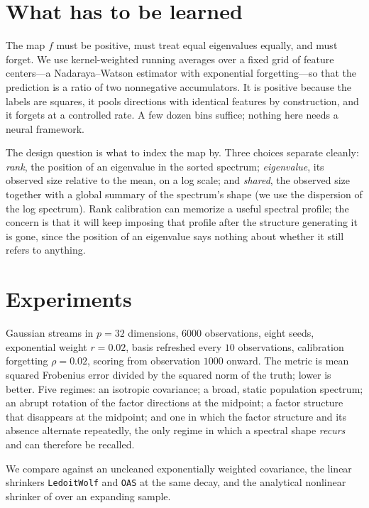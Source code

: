 \documentclass[11pt]{article}
\begin{document}
\section{What has to be learned}

The map $f$ must be positive, must treat equal eigenvalues equally, and must forget. We use
kernel-weighted running averages over a fixed grid of feature centers---a Nadaraya--Watson estimator
with exponential forgetting---so that the prediction is a ratio of two nonnegative accumulators. It
is positive because the labels are squares, it pools directions with identical features by
construction, and it forgets at a controlled rate. A few dozen bins suffice; nothing here needs a
neural framework.

The design question is what to index the map by. Three choices separate cleanly:
\emph{rank}, the position of an eigenvalue in the sorted spectrum; \emph{eigenvalue}, its observed
size relative to the mean, on a log scale; and \emph{shared}, the observed size together with a
global summary of the spectrum's shape (we use the dispersion of the log spectrum). Rank calibration
can memorize a useful spectral profile; the concern is that it will keep imposing that profile after
the structure generating it is gone, since the position of an eigenvalue says nothing about whether
it still refers to anything.

\section{Experiments}

Gaussian streams in $p = 32$ dimensions, $6000$ observations, eight seeds, exponential weight
$r = 0.02$, basis refreshed every $10$ observations, calibration forgetting $\rho = 0.02$, scoring
from observation $1000$ onward. The metric is mean squared Frobenius error divided by the squared
norm of the truth; lower is better. Five regimes: an isotropic covariance; a broad, static
population spectrum; an abrupt rotation of the factor directions at the midpoint; a factor structure
that disappears at the midpoint; and one in which the factor structure and its absence alternate
repeatedly, the only regime in which a spectral shape \emph{recurs} and can therefore be recalled.

We compare against an uncleaned exponentially weighted covariance, the linear shrinkers
\texttt{LedoitWolf} and \texttt{OAS} at the same decay, and the analytical nonlinear shrinker of
\citet{ledoitwolf2020analytical} over an expanding sample.
\end{document}
